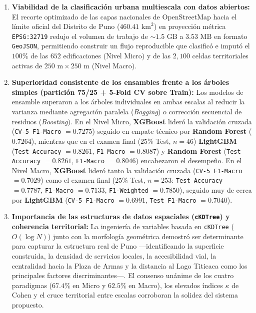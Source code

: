 \documentclass[11pt,a4paper]{article}
\begin{document}
\begin{enumerate}[leftmargin=0.8cm, itemsep=3pt]
    \item \textbf{Viabilidad de la clasificación urbana multiescala con datos abiertos:} El recorte optimizado de las capas nacionales de OpenStreetMap hacia el límite oficial del Distrito de Puno ($460.41\text{ km}^2$) en proyección métrica \texttt{EPSG:32719} redujo el volumen de trabajo de $\sim 1.5\text{ GB}$ a $3.53\text{ MB}$ en formato \texttt{GeoJSON}, permitiendo construir un flujo reproducible que clasificó e imputó el $100\%$ de las $652$ edificaciones (Nivel Micro) y de las $2{,}100$ celdas territoriales activas de $250\text{ m} \times 250\text{ m}$ (Nivel Macro).
    \item \textbf{Superioridad consistente de los ensambles frente a los árboles simples (partición 75/25 + 5-Fold CV sobre Train):} Los modelos de ensamble superaron a los árboles individuales en ambas escalas al reducir la varianza mediante agregación paralela (\textit{Bagging}) o corrección secuencial de residuos (\textit{Boosting}). En el Nivel Micro, \textbf{XGBoost} lideró la validación cruzada (\texttt{CV-5 F1-Macro} $= 0.7275$) seguido en empate técnico por \textbf{Random Forest} ($0.7264$), mientras que en el examen final ($25\%$ Test, $n=46$) \textbf{LightGBM} (\texttt{Test Accuracy} $= 0.8261$, \texttt{F1-Macro} $= 0.8087$) y \textbf{Random Forest} (\texttt{Test Accuracy} $= 0.8261$, \texttt{F1-Macro} $= 0.8046$) encabezaron el desempeño. En el Nivel Macro, \textbf{XGBoost} lideró tanto la validación cruzada (\texttt{CV-5 F1-Macro} $= 0.7029$) como el examen final ($25\%$ Test, $n=253$: \texttt{Test Accuracy} $= 0.7787$, \texttt{F1-Macro} $= 0.7133$, \texttt{F1-Weighted} $= 0.7850$), seguido muy de cerca por \textbf{LightGBM} (\texttt{CV-5 F1-Macro} $= 0.6991$, \texttt{Test F1-Macro} $= 0.7040$).
    \item \textbf{Importancia de las estructuras de datos espaciales (\texttt{cKDTree}) y coherencia territorial:} La ingeniería de variables basada en \texttt{cKDTree} ($O(\log N)$) junto con la morfología geométrica demostró ser determinante para capturar la estructura real de Puno —identificando la superficie construida, la densidad de servicios locales, la accesibilidad vial, la centralidad hacia la Plaza de Armas y la distancia al Lago Titicaca como los principales factores discriminantes—. El consenso unánime de los cuatro paradigmas ($67.4\%$ en Micro y $62.5\%$ en Macro), los elevados índices $\kappa$ de Cohen y el cruce territorial entre escalas corroboran la solidez del sistema propuesto.
\end{enumerate}
\newpage
\end{document}
